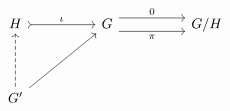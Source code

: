\[\begin{tikzcd}
	H && G && {G/H} \\
	\\
	{G'}
	\arrow["0", shift left=2, from=1-3, to=1-5]
	\arrow["\pi"', shift right=2, from=1-3, to=1-5]
	\arrow["\iota", tail, from=1-1, to=1-3]
	\arrow[from=3-1, to=1-3]
	\arrow[dashed, from=3-1, to=1-1]
\end{tikzcd}\]